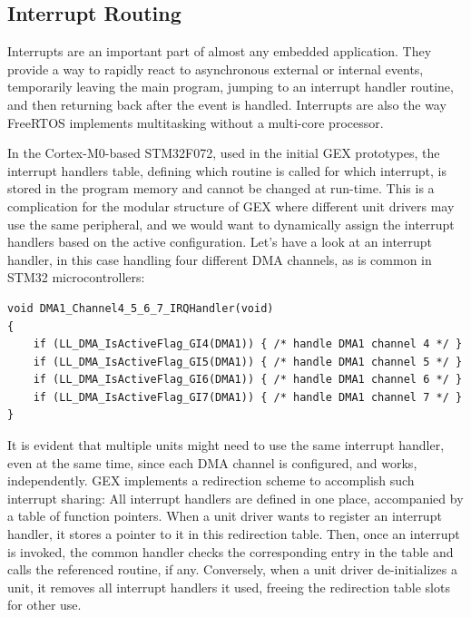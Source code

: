 \subsection{Interrupt Routing} \label{sec:irq-routing}

Interrupts are an important part of almost any embedded application. They provide a way to rapidly react to asynchronous external or internal events, temporarily leaving the main program, jumping to an interrupt handler routine, and then returning back after the event is handled. Interrupts are also the way FreeRTOS implements multitasking without a multi-core processor.

In the \arm Cortex-M0-based STM32F072, used in the initial GEX prototypes, the interrupt handlers table, defining which routine is called for which interrupt, is stored in the program memory and cannot be changed at run-time. This is a complication for the modular structure of GEX where different unit drivers may use the same peripheral, and we would want to dynamically assign the interrupt handlers based on the active configuration. Let's have a look at an interrupt handler, in this case handling four different \gls{DMA} channels, as is common in STM32 microcontrollers:

\begin{verbatim}
void DMA1_Channel4_5_6_7_IRQHandler(void)
{
    if (LL_DMA_IsActiveFlag_GI4(DMA1)) { /* handle DMA1 channel 4 */ }
    if (LL_DMA_IsActiveFlag_GI5(DMA1)) { /* handle DMA1 channel 5 */ }
    if (LL_DMA_IsActiveFlag_GI6(DMA1)) { /* handle DMA1 channel 6 */ }
    if (LL_DMA_IsActiveFlag_GI7(DMA1)) { /* handle DMA1 channel 7 */ }
}
\end{verbatim}

It is evident that multiple units might need to use the same interrupt handler, even at the same time, since each \gls{DMA} channel is configured, and works, independently. GEX implements a redirection scheme to accomplish such interrupt sharing: All interrupt handlers are defined in one place, accompanied by a table of function pointers. When a unit driver wants to register an interrupt handler, it stores a pointer to it in this redirection table. Then, once an interrupt is invoked, the common handler checks the corresponding entry in the table and calls the referenced routine, if any. Conversely, when a unit driver de-initializes a unit, it removes all interrupt handlers it used, freeing the redirection table slots for other use.











